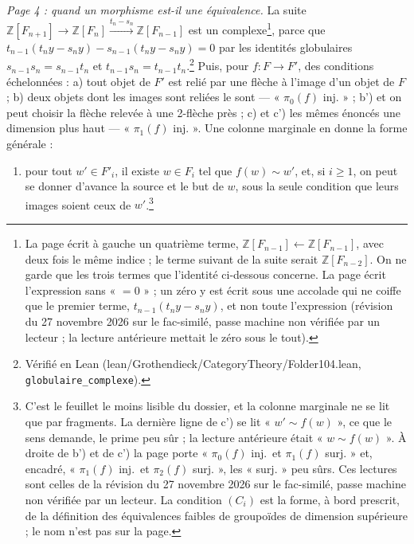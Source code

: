 \documentclass[11pt,a4paper]{article}
\begin{document}
\emph{Page 4 : quand un morphisme est-il une équivalence.} La suite
$\mathbb{Z}[F_{n+1}] \to \mathbb{Z}[F_{n}] \xrightarrow{t_{n} - s_{n}}
\mathbb{Z}[F_{n-1}]$ est un complexe\footnote{La page écrit à gauche un
quatrième terme, $\mathbb{Z}[F_{n-1}] \longleftarrow
\mathbb{Z}[F_{n-1}]$, avec deux fois le même indice ; le terme suivant de la
suite serait $\mathbb{Z}[F_{n-2}]$. On ne garde que les trois termes que
l'identité ci-dessous concerne. La page écrit l'expression sans « $= 0$ » ;
un zéro y est écrit sous une accolade qui ne coiffe que le premier terme,
$t_{n-1}(t_{n}y - s_{n}y)$, et non toute l'expression (révision du 27 novembre
2026 sur le fac-similé, passe machine non vérifiée par un lecteur ; la lecture
antérieure mettait le zéro sous le tout).}, parce que
$t_{n-1}(t_{n}y - s_{n}y) - s_{n-1}(t_{n}y - s_{n}y) = 0$ par les identités
globulaires $s_{n-1}s_{n} = s_{n-1}t_{n}$ et $t_{n-1}s_{n} = t_{n-1}t_{n}$.\footnote{Vérifié
en Lean (lean/Grothendieck/CategoryTheory/Folder104.lean, \texttt{globulaire\_complexe}).}
Puis, pour $f : F \to F'$, des conditions échelonnées : a) tout objet de
$F'$ est relié par une flèche à l'image d'un objet de $F$ ; b) deux objets
dont les images sont reliées le sont --- « $\pi_{0}(f)$ inj. » ; b') et on peut
choisir la flèche relevée à une 2-flèche près ; c) et c') les mêmes énoncés une
dimension plus haut --- « $\pi_{1}(f)$ inj. ». Une colonne marginale en donne la
forme générale :
\begin{enumerate}
\item[$(C_{i})$] pour tout $w' \in F'_{i}$, il existe $w \in F_{i}$ tel que
$f(w) \sim w'$, et, si $i \geq 1$, on peut se donner d'avance la source et le
but de $w$, sous la seule condition que leurs images soient ceux de
$w'$.\footnote{C'est le feuillet le moins lisible du dossier, et la colonne
marginale ne se lit que par fragments. La dernière ligne de c') se lit
« $w' \sim f(w)$ », ce que le sens demande, le prime peu sûr ; la lecture
antérieure était « $w \sim f(w)$ ». À droite de b') et de c') la page porte
« $\pi_{0}(f)$ inj.\ et $\pi_{1}(f)$ surj. » et, encadré, « $\pi_{1}(f)$ inj.\ et
$\pi_{2}(f)$ surj. », les « surj. » peu sûrs. Ces lectures sont celles de la
révision du 27 novembre 2026 sur le fac-similé, passe machine non vérifiée
par un lecteur. La condition $(C_{i})$ est
la forme, à bord prescrit, de la définition des équivalences faibles de
groupoïdes de dimension supérieure ; le nom n'est pas sur la page.}
\end{enumerate}
\end{document}
